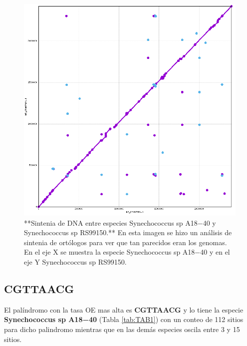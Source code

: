 \documentclass[
]{book}
\begin{document}
\begin{figure}

{\centering \includegraphics[width=11.11in]{figures/out} 

}

\caption{**Sintenia de DNA entre especies Synechococcus sp A18−40 y Synechococcus sp RS99150.** En esta imagen se hizo un análisis de sintenia de ortólogos para ver que tan parecidos eran los genomas. En el eje X se muestra la especie Synechococcus sp A18−40 y en el eje Y Synechococcus sp RS99150.}\label{fig:FIG9}
\end{figure}

\hypertarget{cgttaacg}{%
\subsection{CGTTAACG}\label{cgttaacg}}

El palíndromo con la tasa OE mas alta es \textbf{CGTTAACG} y lo tiene la especie \textbf{Synechococcus sp A18−40} (Tabla \ref{tab:TAB1}) con un conteo de 112 sitios para dicho palindromo mientras que en las demás especies oscila entre 3 y 15 sitios.
\end{document}
